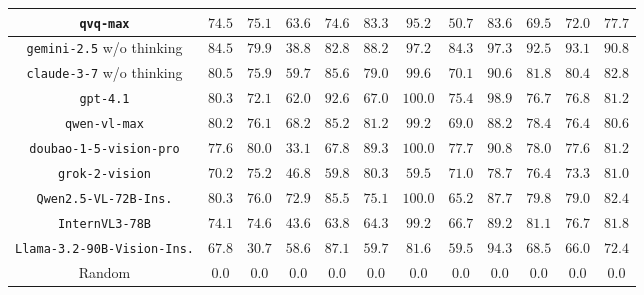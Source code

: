 \begin{table}[t]
\begin{tabular}{cccccccccccc}
\texttt{qvq-max} & $74.5$ & $75.1$ & $63.6$ & $74.6$ & $83.3$ & $95.2$ & $50.7$ & $83.6$ & $69.5$ & $72.0$ & $77.7$ \\
\midrule
\texttt{gemini-2.5} w/o thinking & \cellcolor{second} $84.5$ & \cellcolor{second} $79.9$ & $38.8$ & $82.8$ & $88.2$ & $97.2$ & \cellcolor{second} $84.3$ & \cellcolor{third} $97.3$ & \cellcolor{first} $92.5$ & \cellcolor{first} $93.1$ & \cellcolor{first} $90.8$ \\
\texttt{claude-3-7} w/o thinking & $80.5$ & $75.9$ & $59.7$ & $85.6$ & $79.0$ & $99.6$ & $70.1$ & $90.6$ & $81.8$ & \cellcolor{second} $80.4$ & $82.8$ \\
\texttt{gpt-4.1} & $80.3$ & $72.1$ & $62.0$ & \cellcolor{second} $92.6$ & $67.0$ & \cellcolor{first} $100.0$ & $75.4$ & \cellcolor{first} $98.9$ & $76.7$ & $76.8$ & $81.2$ \\
\texttt{qwen-vl-max} & $80.2$ & $76.1$ & \cellcolor{third} $68.2$ & $85.2$ & $81.2$ & $99.2$ & $69.0$ & $88.2$ & $78.4$ & $76.4$ & $80.6$ \\
\texttt{doubao-1-5-vision-pro} & $77.6$ & \cellcolor{first} $80.0$ & $33.1$ & $67.8$ & $89.3$ & \cellcolor{first} $100.0$ & \cellcolor{third} $77.7$ & $90.8$ & $78.0$ & $77.6$ & $81.2$ \\
\texttt{grok-2-vision} & $70.2$ & $75.2$ & $46.8$ & $59.8$ & $80.3$ & $59.5$ & $71.0$ & $78.7$ & $76.4$ & $73.3$ & $81.0$ \\
\midrule
\texttt{Qwen2.5-VL-72B-Ins.} & $80.3$ & $76.0$ & \cellcolor{first} $72.9$ & $85.5$ & $75.1$ & \cellcolor{first} $100.0$ & $65.2$ & $87.7$ & $79.8$ & $79.0$ & $82.4$ \\
\texttt{InternVL3-78B} & $74.1$ & $74.6$ & $43.6$ & $63.8$ & $64.3$ & $99.2$ & $66.7$ & $89.2$ & $81.1$ & $76.7$ & $81.8$ \\
\texttt{Llama-3.2-90B-Vision-Ins.} & $67.8$ & $30.7$ & $58.6$ & $87.1$ & $59.7$ & $81.6$ & $59.5$ & $94.3$ & $68.5$ & $66.0$ & $72.4$ \\
\midrule
Random & $0.0$ & $0.0$ & $0.0$ & $0.0$ & $0.0$ & $0.0$ & $0.0$ & $0.0$ & $0.0$ & $0.0$ & $0.0$ \\
\bottomrule
\end{tabular}
\end{table}
